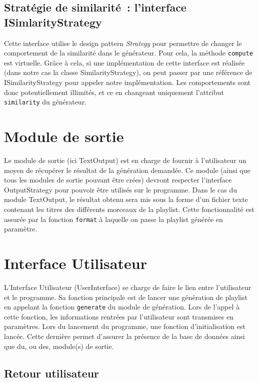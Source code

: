 \subsection{Stratégie de similarité~: l'interface ISimlarityStrategy}
\label{archi:generation:similarity}

Cette interface utilise le design pattern \emph{Strategy} pour permettre de
changer le comportement de la similarité dans le générateur. Pour cela,
la méthode \texttt{compute} est virtuelle. Grâce à cela, si une implémentation
de cette interface est réalisée (dans notre cas la classe SimilarityStrategy),
on peut passer par une référence de ISimilarityStrategy pour appeler notre
implémentation. Les comportements sont donc potentiellement illimités, et ce
en changeant uniquement l'attribut \texttt{similarity} du générateur.

\section{Module de sortie}
\label{archi:sortie}

Le module de sortie (ici TextOutput) est en charge de fournir à 
l'utilisateur un moyen de récupérer le résultat de la génération demandée. 
Ce module (ainsi que tous les modules de sortie pouvant être crées) devront 
respecter l'interface OutputStrategy pour pouvoir être utilisés sur le 
programme. Dans le cas du module TextOutput, le résultat obtenu sera mis 
sous la forme d'un fichier texte contenant les titres des différents 
morceaux de la playlist. Cette fonctionnalité est assurée par la fonction 
\texttt{format} à laquelle on passe la playlist générée en paramètre.

\section{Interface Utilisateur}
\label{archi:interface}

L'Interface Utilisateur (UserInterface) se charge de faire le lien entre
l'utilisateur et le programme. Sa fonction principale est de lancer une
génération de playlist en appelant la fonction \texttt{generate} du module de 
génération. Lors de l'appel à cette fonction, les informations rentrées par 
l'utilisateur sont transmises en paramètres. Lors du lancement du programme,
une fonction d'initialisation est lancée. Cette dernière permet d'assurer 
la présence de la base de données ainsi que du, ou des, module(s) de sortie.

\subsection{Retour utilisateur}
\label{archi:interface:feedback}

